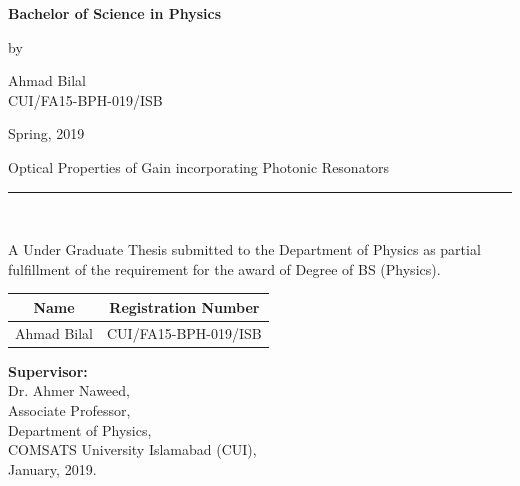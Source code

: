 \documentclass[12pt,twoside]{report}
\begin{document}
	\vspace{0.5 in}
	
	\begin{center}
		{\Large {\textbf{Bachelor of Science in Physics}} }
	\end{center}
	
	\vspace{0.5 in}
	\begin{center}
		{by }
	\end{center}
	\begin{center}
		{\large {Ahmad Bilal\\[0pt]
				CUI/FA15-BPH-019/ISB\\[0pt]
		}}
	\end{center}
	\vspace{0.5 in}
	\begin{center}
		Spring, 2019
	\end{center}
	\newpage
	\begin{center}
{\Large {Optical Properties of Gain incorporating Photonic Resonators}\\[0pt]
		\noindent\rule{18cm}{3pt}} \\
\end{center}
\vspace{0.2 in} 
		A Under Graduate Thesis submitted to the Department of Physics as partial fulfillment of the requirement for the award of Degree of BS (Physics). 
\vspace{0.5 in}
\begin{center}
	\begin{tabular}{ | c| c | }
			\hline
			Name &  Registration Number \\
			\hline
		Ahmad Bilal & CUI/FA15-BPH-019/ISB \\ 
			\hline
	\end{tabular}
\end{center}
	\vspace{3 in}
	\textbf {Supervisor:}\\
	Dr. Ahmer Naweed,\\
	Associate Professor,\\
	Department of Physics,\\
	COMSATS University Islamabad (CUI),\\
	January, 2019.
	\newpage
	
\end{document}
